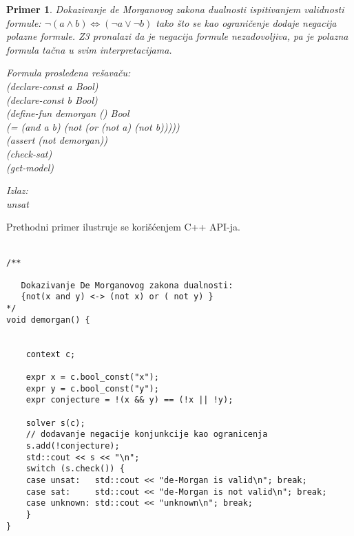 \documentclass[12pt,oneside]{memoir}
\newtheorem{primer}{Primer}
\begin{document}
\begin{primer} Dokazivanje de Morganovog zakona dualnosti ispitivanjem validnosti formule: $\neg{(a \land b)} \Leftrightarrow (\neg{a} \lor \neg{b}) $ tako što se kao ograničenje dodaje negacija polazne formule. Z3 pronalazi da je negacija formule nezadovoljiva, pa je polazna formula tačna u svim interpretacijama. \\

\hspace{-0.7cm}
\begin{minipage}[b]{0.4\textwidth}
Formula prosleđena rešavaču:
\\(declare-const a Bool)
\\(declare-const b Bool)
\\(define-fun demorgan () Bool
\\    (= (and a b) (not (or (not a) (not b)))))
\\(assert (not demorgan))
\\(check-sat) 
\\(get-model)
\end{minipage}
\hspace{3.5cm}
\begin{minipage}[t]{0.4\textwidth}
\vspace{-5.35cm}
Izlaz:
\\unsat
\end{minipage}
\end{primer}



Prethodni primer ilustruje se korišćenjem C++ API-ja.
\\ \\
\begin{lstlisting}
/**

   Dokazivanje De Morganovog zakona dualnosti: 
   {not(x and y) <-> (not x) or ( not y) }
*/
void demorgan() {

    
    context c;

    expr x = c.bool_const("x");
    expr y = c.bool_const("y");
    expr conjecture = !(x && y) == (!x || !y);
    
    solver s(c);
    // dodavanje negacije konjunkcije kao ogranicenja
    s.add(!conjecture);
    std::cout << s << "\n";
    switch (s.check()) {
    case unsat:   std::cout << "de-Morgan is valid\n"; break;
    case sat:     std::cout << "de-Morgan is not valid\n"; break;
    case unknown: std::cout << "unknown\n"; break;
    }
}

\end{lstlisting}
\end{document}

